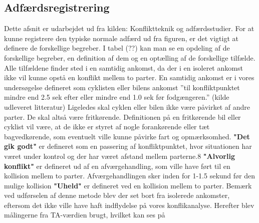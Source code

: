 \subsection{Adfærdsregistrering}
\label{adfreg}
Dette afsnit er udarbejdet ud fra kilden: Konfliktteknik og adfærdsstudier.
For	at kunne registrere den typiske normale adfærd ud	 fra figuren, er det vigtigt at definere	de	forskellige	begreber. I tabel (??) kan man se en	opdeling af de forskellige begreber, en definition af dem og en optælling af de forskellige tilfælde. Alle	tilfældene finder sted i	en samtidig ankomst, da der i en isoleret ankomst	 ikke vil kunne	opstå en konflikt mellem to parter. En samtidig ankomst er i vores undersøgelse defineret som cyklisten eller bilens ankomst ”til konfliktpunktet mindre end 2.5 sek efter eller mindre end 1.0 sek før fodgængeren.” (kilde udleveret	litteratur)	Ligeledes skal cyklen	eller bilen ikke være påvirket af andre parter. De skal altså være fritkørende. Definitionen på en fritkørende bil eller cyklist	vil	være, at de ikke er styret af nogle	forankørende eller tæt bagvedkørende, som eventuelt ville kunne påvirke fart og opmærksomhed.
\textbf{"Det	gik	godt"} er defineret som en passering af konfliktpunktet, hvor situationen
har	været under kontrol og der har været afstand mellem parterne.8
\textbf{"Alvorlig konflikt"}	er defineret ud af en afværgehandling, som ville have ført til en kollision mellem to parter. Afværgehandlingen sker inden for 1-1.5 sekund før den mulige	kollision%
\textbf{"Uheld"} er defineret ved en kollision mellem to parter.
Bemærk ved udførselen af denne metode blev der set bort fra isolerede ankomster, eftersom det ikke ville have haft indflydelse på vores konflikanalyse. Herefter blev målingerne fra TA-værdien brugt, hvilket kan ses på %
